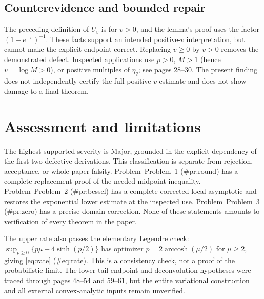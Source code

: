 \documentclass[10pt]{article}
\begin{document}
\subsection*{Counterevidence and bounded repair}
The preceding definition of \(U_v\) is for \(v>0\), and the lemma’s proof uses the factor \((1-e^{-v})^{-1}\). These facts support an intended positive-\(v\) interpretation, but cannot make the explicit endpoint correct. Replacing \(v\ge0\) by \(v>0\) removes the demonstrated defect. Inspected applications use \(p>0\), \(M>1\) (hence \(v=\log M>0\)), or positive multiples of \(\eta_q\); see pages 28–30. The present finding does not independently certify the full positive-\(v\) estimate and does not show damage to a final theorem.\par
\section*{Assessment and limitations}
The highest supported severity is Major, grounded in the explicit dependency of the first two defective derivations. This classification is separate from rejection, acceptance, or whole-paper falsity. Problem Problem 1 (\#pr:round) has a complete replacement proof of the needed midpoint inequality. Problem Problem 2 (\#pr:bessel) has a complete corrected local asymptotic and restores the exponential lower estimate at the inspected use. Problem Problem 3 (\#pr:zero) has a precise domain correction. None of these statements amounts to verification of every theorem in the paper.\par
The upper rate also passes the elementary Legendre check: \(\sup_{p\ge0}\{p\mu-4\sinh(p/2)\}\) has optimizer \(p=2\mathop{\mathrm{arccosh}}(\mu/2)\) for \(\mu\ge2\), giving [eq:rate] (\#eq:rate). This is a consistency check, not a proof of the probabilistic limit. The lower-tail endpoint and deconvolution hypotheses were traced through pages 48–54 and 59–61, but the entire variational construction and all external convex-analytic inputs remain unverified.\par
\end{document}
